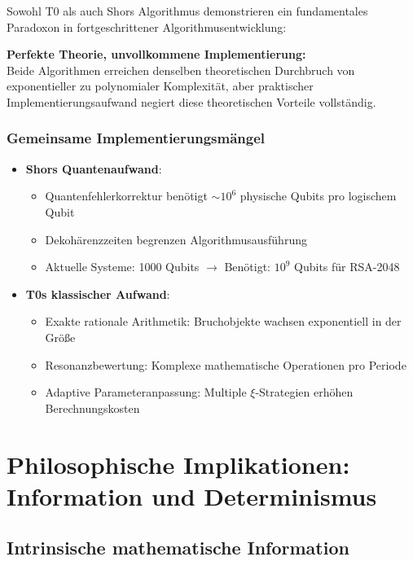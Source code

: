 \documentclass[12pt,a4paper]{article}
\begin{document}
	Sowohl T0 als auch Shors Algorithmus demonstrieren ein fundamentales Paradoxon in fortgeschrittener Algorithmusentwicklung:
	
	\begin{tcolorbox}[colback=yellow!10,colframe=orange!50,title=Kernproblem]
		\textbf{Perfekte Theorie, unvollkommene Implementierung:} \\
		Beide Algorithmen erreichen denselben theoretischen Durchbruch von exponentieller zu polynomialer Komplexität, aber praktischer Implementierungsaufwand negiert diese theoretischen Vorteile vollständig.
	\end{tcolorbox}
	
	\subsubsection{Gemeinsame Implementierungsmängel}
	\begin{itemize}
		\item \textbf{Shors Quantenaufwand}: 
		\begin{itemize}
			\item Quantenfehlerkorrektur benötigt $\sim 10^6$ physische Qubits pro logischem Qubit
			\item Dekohärenzzeiten begrenzen Algorithmusausführung
			\item Aktuelle Systeme: 1000 Qubits $\rightarrow$ Benötigt: $10^9$ Qubits für RSA-2048
		\end{itemize}
		
		\item \textbf{T0s klassischer Aufwand}:
		\begin{itemize}
			\item Exakte rationale Arithmetik: Bruchobjekte wachsen exponentiell in der Größe
			\item Resonanzbewertung: Komplexe mathematische Operationen pro Periode
			\item Adaptive Parameteranpassung: Multiple $\xi$-Strategien erhöhen Berechnungskosten
		\end{itemize}
	\end{itemize}
	
	\section{Philosophische Implikationen: Information und Determinismus}
	
	\subsection{Intrinsische mathematische Information}
	
\end{document}
